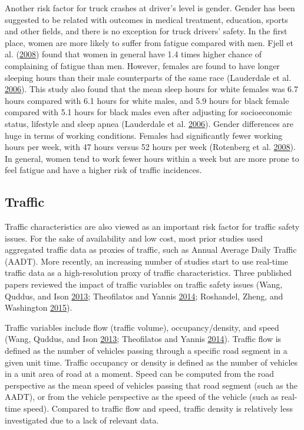 \documentclass[12pt]{book}
\numberwithin{equation}{chapter}
\begin{document}
Another risk factor for truck crashes at driver's level is gender. Gender has been suggested to be related with outcomes in medical treatment, education, sports and other fields, and there is no exception for truck drivers' safety. In the first place, women are more likely to suffer from fatigue compared with men. Fjell et al. (\protect\hyperlink{ref-fjell2008perceived}{2008}) found that women in general have 1.4 times higher chance of complaining of fatigue than men. However, females are found to have longer sleeping hours than their male counterparts of the same race (Lauderdale et al. \protect\hyperlink{ref-lauderdale2006objectively}{2006}). This study also found that the mean sleep hours for white females was 6.7 hours compared with 6.1 hours for white males, and 5.9 hours for black female compared with 5.1 hours for black males even after adjusting for socioeconomic status, lifestyle and sleep apnea (Lauderdale et al. \protect\hyperlink{ref-lauderdale2006objectively}{2006}). Gender differences are huge in terms of working conditions. Females had significantly fewer working hours per week, with 47 hours versus 52 hours per week (Rotenberg et al. \protect\hyperlink{ref-rotenberg2008gender}{2008}). In general, women tend to work fewer hours within a week but are more prone to feel fatigue and have a higher risk of traffic incidences.

\hypertarget{traffic}{%
\subsection{Traffic}\label{traffic}}

Traffic characteristics are also viewed as an important risk factor for traffic safety issues. For the sake of availability and low cost, most prior studies used aggregated traffic data as proxies of traffic, such as Annual Average Daily Traffic (AADT). More recently, an increasing number of studies start to use real-time traffic data as a high-resolution proxy of traffic characteristics. Three published papers reviewed the impact of traffic variables on traffic safety issues (Wang, Quddus, and Ison \protect\hyperlink{ref-wang2013effect}{2013}; Theofilatos and Yannis \protect\hyperlink{ref-theofilatos2014review}{2014}; Roshandel, Zheng, and Washington \protect\hyperlink{ref-roshandel2015impact}{2015}).

Traffic variables include flow (traffic volume), occupancy/density, and speed (Wang, Quddus, and Ison \protect\hyperlink{ref-wang2013effect}{2013}; Theofilatos and Yannis \protect\hyperlink{ref-theofilatos2014review}{2014}). Traffic flow is defined as the number of vehicles passing through a specific road segment in a given unit time. Traffic occupancy or density is defined as the number of vehicles in a unit area of road at a moment. Speed can be computed from the road perspective as the mean speed of vehicles passing that road segment (such as the AADT), or from the vehicle perspective as the speed of the vehicle (such as real-time speed). Compared to traffic flow and speed, traffic density is relatively less investigated due to a lack of relevant data.
\end{document}
